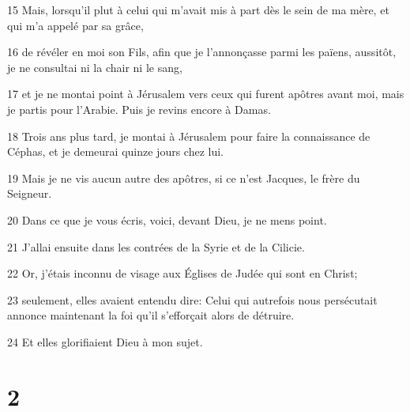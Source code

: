 \par 15 Mais, lorsqu'il plut à celui qui m'avait mis à part dès le sein de ma mère, et qui m'a appelé par sa grâce,
\par 16 de révéler en moi son Fils, afin que je l'annonçasse parmi les païens, aussitôt, je ne consultai ni la chair ni le sang,
\par 17 et je ne montai point à Jérusalem vers ceux qui furent apôtres avant moi, mais je partis pour l'Arabie. Puis je revins encore à Damas.
\par 18 Trois ans plus tard, je montai à Jérusalem pour faire la connaissance de Céphas, et je demeurai quinze jours chez lui.
\par 19 Mais je ne vis aucun autre des apôtres, si ce n'est Jacques, le frère du Seigneur.
\par 20 Dans ce que je vous écris, voici, devant Dieu, je ne mens point.
\par 21 J'allai ensuite dans les contrées de la Syrie et de la Cilicie.
\par 22 Or, j'étais inconnu de visage aux Églises de Judée qui sont en Christ;
\par 23 seulement, elles avaient entendu dire: Celui qui autrefois nous persécutait annonce maintenant la foi qu'il s'efforçait alors de détruire.
\par 24 Et elles glorifiaient Dieu à mon sujet.

\chapter{2}

